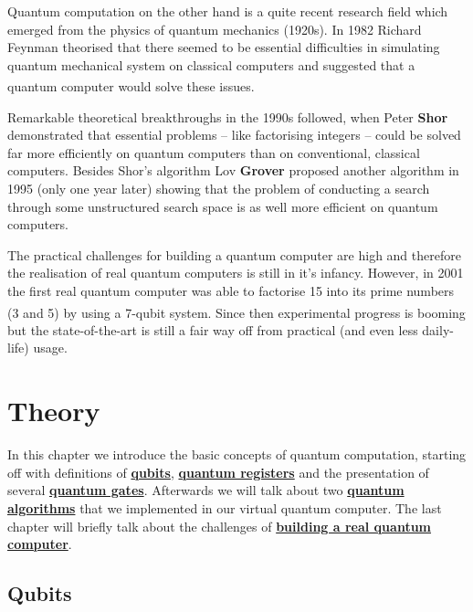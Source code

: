 \documentclass[bibliography=totocnumbered]{article}
\newcommand{\citeS}[1]{\textsuperscript{\cite{#1}}}
\theoremstyle{NoticeStyle}
\begin{document}
Quantum computation on the other hand is a quite recent research field which emerged from the physics of quantum mechanics (1920s). In 1982 Richard Feynman theorised that there seemed to be essential difficulties in simulating quantum mechanical system on classical computers and suggested that a quantum computer would solve these issues.\citeS{Nielsen2010}

Remarkable theoretical breakthroughs in the 1990s followed, when Peter \textbf{Shor} demonstrated that essential problems -- like factorising integers -- could be solved far more efficiently on quantum computers than on conventional, classical computers. Besides Shor's algorithm Lov \textbf{Grover} proposed another algorithm in 1995 (only one year later) showing that the problem of conducting a search through some unstructured search space is as well more efficient on quantum computers.

The practical challenges for building a quantum computer are high and therefore the realisation of real quantum computers is still in it's infancy. However, in 2001 the first real quantum computer was able to factorise 15 into its prime numbers (3 and 5) by using a 7-qubit system.\citeS{ShorsAlgoReal} Since then experimental progress is booming but the state-of-the-art is still a fair way off from practical (and even less daily-life) usage.


%
\section{Theory}\label{sec:Theory}

In this chapter we introduce the basic concepts of quantum computation, starting off with definitions of \hyperref[sec:Qubits]{\textbf{qubits}}, \hyperref[sec:Quantum register]{\textbf{quantum registers}} and the presentation of several \hyperref[sec:Quantum gates]{\textbf{quantum gates}}. Afterwards we will talk about two \hyperref[sec:Quantum algorithms]{\textbf{quantum algorithms}} that we implemented in our virtual quantum computer. The last chapter will briefly talk about the challenges of \hyperref[sec:Building a quantum computer]{\textbf{building a real quantum computer}}.

\subsection{Qubits}\label{sec:Qubits}
\end{document}
